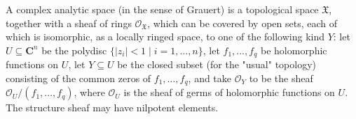 A complex analytic space (in the sense of Grauert) is a topological space $\mathfrak{X}$, together with a sheaf of rings $\mathcal{O}_{\mathfrak{X}}$, which can be covered by open sets, each of which is isomorphic, as a locally ringed space, to one of the following kind $Y$: let $U \subseteq \mathbf{C}^n$ be the polydisc $\{|z_i| < 1 \mid i = 1, \ldots, n\}$, let $f_1, \ldots, f_q$ be holomorphic functions on $U$, let $Y \subseteq U$ be the closed subset (for the "usual" topology) consisting of the common zeros of $f_1, \ldots, f_q$, and take $\mathcal{O}_Y$ to be the sheaf $\mathcal{O}_U / (f_1, \ldots, f_q)$, where $\mathcal{O}_U$ is the sheaf of germs of holomorphic functions on $U$. The structure sheaf may have nilpotent elements.
